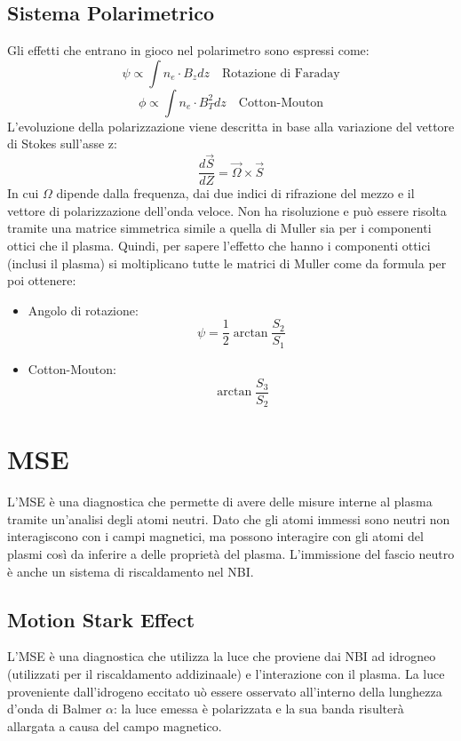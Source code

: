 \documentclass{article}
\begin{document}
\subsection{Sistema Polarimetrico}
Gli effetti che entrano in gioco nel polarimetro sono espressi come:
\begin{equation}
	\psi\propto \int n_{e}\cdot B_{z}dz\quad\text{Rotazione di Faraday}
\end{equation}
\begin{equation}
	\phi\propto \int n_{e}\cdot B_{T}^{2}dz\quad \text{Cotton-Mouton}
\end{equation}
L'evoluzione della polarizzazione viene descritta in base alla variazione del vettore di Stokes sull'asse z:
\begin{equation}
	\frac{d\overrightarrow{S}}{dZ}=\overrightarrow{\Omega}\times\overrightarrow{S}
\end{equation}
In cui \(\Omega \) dipende dalla frequenza, dai due indici di rifrazione del mezzo e il vettore di polarizzazione dell'onda veloce. Non ha risoluzione e può essere risolta tramite una matrice simmetrica simile a quella di Muller sia per i componenti ottici che il plasma.\newline
Quindi, per sapere l'effetto che hanno i componenti ottici (inclusi il plasma) si moltiplicano tutte le matrici di Muller come da formula per poi ottenere:
\begin{itemize}
	\item Angolo di rotazione:
	      \begin{equation}
		      \psi =\frac{1}{2}\arctan{\frac{S_{2}}{S_{1}}}
	      \end{equation}
	\item Cotton-Mouton: \begin{equation}
		      \arctan{\frac{S_{3}}{S_{2}}}
	      \end{equation}
\end{itemize}
\section{MSE}
L'MSE è una diagnostica che permette di avere delle misure interne al plasma tramite un'analisi degli atomi neutri.\newline
Dato che gli atomi immessi sono neutri non interagiscono con i campi magnetici, ma possono interagire con gli atomi del plasmi così da inferire a delle proprietà del plasma. L'immissione del fascio neutro è anche un sistema di riscaldamento nel NBI.%
\subsection{Motion Stark Effect}
L'MSE è una diagnostica che utilizza la luce che proviene dai NBI ad idrogneo (utilizzati per il riscaldamento addizinaale) e l'interazione con il plasma. La luce proveniente dall'idrogeno eccitato uò essere osservato all'interno della lunghezza d'onda di Balmer \(\alpha \): la luce emessa è polarizzata e la sua banda risulterà allargata a causa del campo magnetico.
\end{document}
